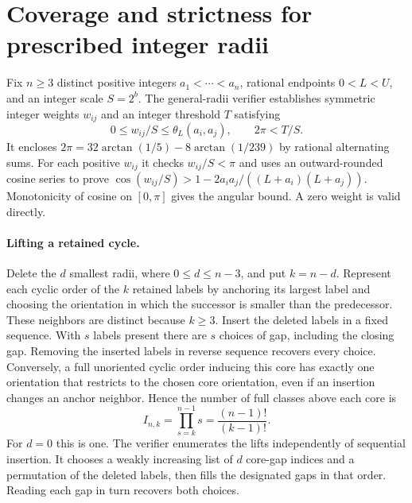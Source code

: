 \section{Coverage and strictness for prescribed integer radii}\label{app:general}
Fix $n\ge3$ distinct positive integers $a_1<\cdots<a_n$, rational
endpoints $0<L<U$, and an integer scale $S=2^b$. The general-radii
verifier establishes symmetric integer weights $w_{ij}$ and an integer
threshold $T$ satisfying
\[
  0\le w_{ij}/S\le\theta_L(a_i,a_j),\qquad 2\pi<T/S.
\]
It encloses $2\pi=32\arctan(1/5)-8\arctan(1/239)$ by rational alternating
sums. For each positive $w_{ij}$ it checks $w_{ij}/S<\pi$ and uses an
outward-rounded cosine series to prove
$\cos(w_{ij}/S)>1-2a_i a_j/((L+a_i)(L+a_j))$. Monotonicity of cosine
on $[0,\pi]$ gives the angular bound. A zero weight is valid directly.

\paragraph{Lifting a retained cycle.}
Delete the $d$ smallest radii, where $0\le d\le n-3$, and put $k=n-d$.
Represent each cyclic order of the $k$ retained labels by anchoring its
largest label and choosing the orientation in which the successor is
smaller than the predecessor. These neighbors are distinct because
$k\ge3$. Insert the deleted labels in a fixed sequence. With $s$ labels
present there are $s$ choices of gap, including the closing gap. Removing
the inserted labels in reverse sequence recovers every choice. Conversely,
a full unoriented cyclic order inducing this core has exactly one
orientation that restricts to the chosen core orientation, even if an
insertion changes an anchor neighbor. Hence the number of full classes
above each core is
\[
 I_{n,k}=\prod_{s=k}^{n-1}s=\frac{(n-1)!}{(k-1)!}.
\]
For $d=0$ this is one. The verifier enumerates the lifts independently of
sequential insertion. It chooses a weakly increasing list of $d$ core-gap
indices and a permutation of the deleted labels, then fills the designated
gaps in that order. Reading each gap in turn recovers both choices.

